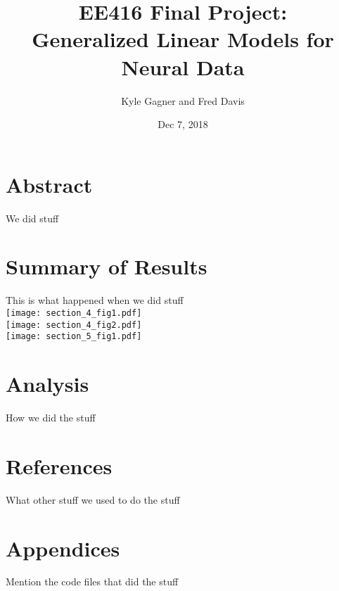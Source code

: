 \documentclass[letterpaper,titlepage,10pt]{article}
\title{EE416 Final Project:\\Generalized Linear Models for Neural Data}
\date{Dec 7, 2018}
\author{Kyle Gagner and Fred Davis}
\begin{document}
\maketitle
\section{Abstract}
We did stuff
\section{Summary of Results}
This is what happened when we did stuff\\
\texttt{[image: section\_4\_fig1.pdf]}\\
\texttt{[image: section\_4\_fig2.pdf]}\\
\texttt{[image: section\_5\_fig1.pdf]}\\
\section{Analysis}
How we did the stuff
\section{References}
What other stuff we used to do the stuff
\section{Appendices}
Mention the code files that did the stuff
\end{document}
